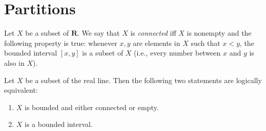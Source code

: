 \section{Partitions}\label{sec 11.1}

\begin{definition}\label{11.1.1}
    Let \(X\) be a subset of \(\mathbf{R}\).
    We say that \(X\) is \emph{connected} iff \(X\) is nonempty and the following property is true:
    whenever \(x, y\) are elements in \(X\) such that \(x < y\), the bounded interval \([x, y]\) is a subset of \(X\)
    (i.e., every number between \(x\) and \(y\) is also in \(X\)).
\end{definition}

\setcounter{theorem}{3}
\begin{lemma}\label{11.1.4}
    Let \(X\) be a subset of the real line.
    Then the following two statements are logically equivalent:
    \begin{enumerate}
        \item \(X\) is bounded and either connected or empty.
        \item \(X\) is a bounded interval.
    \end{enumerate}
\end{lemma}

